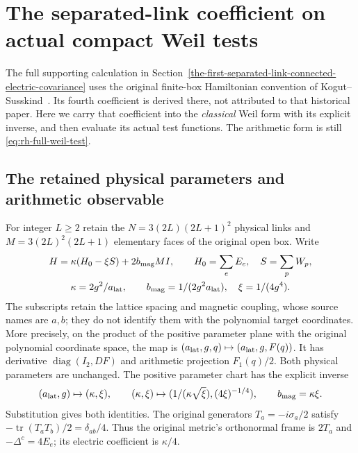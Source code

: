 \section{The separated-link coefficient on actual compact Weil tests}
\label{sec:xi4-actual-Weil}

The full supporting calculation in
Section~\ref{the-first-separated-link-connected-electric-covariance}
uses the original finite-box Hamiltonian convention of
Kogut--Susskind~\cite{kogutSusskind1975}. Its fourth coefficient is
derived there, not attributed to that historical paper. Here we carry
that coefficient into the \emph{classical} Weil form with its explicit
inverse, and then evaluate its actual test functions. The arithmetic
form is still \eqref{eq:rh-full-weil-test}.

\subsection{The retained physical parameters and arithmetic observable}

For integer $L\ge2$ retain the $N=3(2L)(2L+1)^2$ physical links and
$M=3(2L)^2(2L+1)$ elementary faces of the original open box. Write
\[
 \begin{gathered}
 H=\kappa(H_0-\xi S)+2b_{\rm mag}MI,\qquad
 H_0=\sum_e E_e,\quad S=\sum_p W_p,\\
 \kappa=2g^2/a_{\rm lat},\qquad
 b_{\rm mag}=1/(2g^2a_{\rm lat}),\quad \xi=1/(4g^4).
 \end{gathered}
\]
The subscripts retain the lattice spacing and magnetic coupling,
whose source names are $a,b$; they do not identify them with the
polynomial target coordinates. More precisely, on the product of the
positive parameter plane with the original polynomial coordinate
space, the map is
$(a_{\rm lat},g,q)\mapsto(a_{\rm lat},g,F(q))$.
It has derivative $\operatorname{diag}(I_2,DF)$ and arithmetic
projection $F_1(q)/2$. Both physical parameters are unchanged.
The positive parameter chart has the explicit inverse
\[
 (a_{\rm lat},g)\mapsto(\kappa,\xi),\qquad
 (\kappa,\xi)\mapsto
       (1/(\kappa\sqrt{\xi}),(4\xi)^{-1/4}),\qquad b_{\rm mag}=\kappa\xi.
\]
Substitution gives both identities. The original generators
$T_a=-i\sigma_a/2$ satisfy
$-\operatorname{tr}(T_aT_b)/2=\delta_{ab}/4$.
Thus the original metric's orthonormal frame is $2T_a$ and
$-\Delta^c=4E_e$; its electric coefficient is $\kappa/4$.

